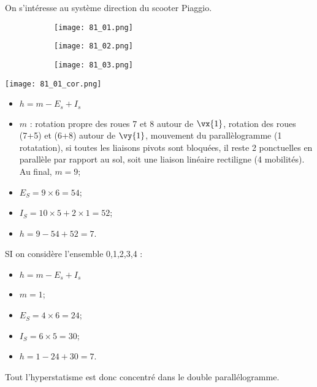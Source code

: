 \normaltrue \difficilefalse \tdifficilefalse
\correctionfalse

\setcounter{question}{0}%


\ifcorrection
\else
{}
\fi


\ifprof
\else
On s'intéresse au système direction du scooter Piaggio.
\begin{figure*}[!h]
\centering
\begin{subfigure}[c]{.3\linewidth}
\centering
\texttt{[image: 81\_01.png]}
\end{subfigure} \hfill
\begin{subfigure}[c]{.3\linewidth}
\centering
\texttt{[image: 81\_02.png]}
\end{subfigure} \hfill
\begin{subfigure}[c]{.3\linewidth}
\centering
\texttt{[image: 81\_03.png]}
\end{subfigure} 
\end{figure*}
\fi

\ifprof
\begin{center}
\texttt{[image: 81\_01\_cor.png]}
\end{center}
\else
\fi

\ifprof
\ifcolle
\else
\begin{itemize}
\item $h = m -E_s + I_s$ 
\item $m$ : rotation propre des roues 7 et 8 autour de $\vx{1}$, rotation des roues (7+5) et (6+8) autour de $\vy{1}$,  mouvement du parallèlogramme (1 rotatation), si toutes les liaisons pivots sont bloquées, il reste 2 ponctuelles en parallèle par rapport au sol, soit une liaison linéaire rectiligne (4 mobilités). Au final, $m=9$;
\item $E_S =9\times 6 = 54$;
\item $I_S = 10\times 5 + 2 \times 1 = 52$;
\item $h = 9 -54 + 52 = 7$.
\end{itemize}
\fi
\else
\fi
{}
\ifprof
SI on considère l'ensemble 0,1,2,3,4 : 
\begin{itemize}
\item $h = m -E_s + I_s$ 
\item $m = 1$; 
\item $E_S =4\times 6 = 24$;
\item $I_S = 6\times 5  = 30$;
\item $h = 1 -24 + 30 = 7$. 
\end{itemize}
Tout l'hyperstatisme est donc concentré dans le double parallélogramme. 

